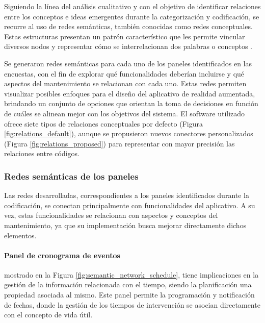         Siguiendo la línea del análisis cualitativo y con el objetivo de identificar relaciones entre los conceptos e ideas emergentes durante la categorización y codificación, se recurre al uso de redes semánticas, también conocidas como redes conceptuales. Estas estructuras presentan un patrón característico que les permite vincular diversos nodos y representar cómo se interrelacionan dos palabras o conceptos \parencite{PEREZ:2022}.  %

        Se generaron redes semánticas para cada uno de los paneles identificados en las encuestas, con el fin de explorar qué funcionalidades deberían incluirse y qué aspectos del mantenimiento se relacionan con cada uno. Estas redes permiten visualizar posibles enfoques para el diseño del aplicativo de realidad aumentada, brindando un conjunto de opciones que orientan la toma de decisiones en función de cuáles se alinean mejor con los objetivos del sistema. El software utilizado ofrece siete tipos de relaciones conceptuales por defecto (Figura \ref{fig:relations_default}), aunque se propusieron nuevos conectores personalizados (Figura \ref{fig:relations_proposed}) para representar con mayor precisión las relaciones entre códigos.

        

        

        \subsubsection{Redes semánticas de los paneles}

            Las redes desarrolladas, correspondientes a los paneles identificados durante la codificación, se conectan principalmente con funcionalidades del aplicativo. A su vez, estas funcionalidades se relacionan con aspectos y conceptos del mantenimiento, ya que su implementación busca mejorar directamente dichos elementos.
            
            \paragraph{Panel de cronograma de eventos} mostrado en la Figura \ref{fig:semantic_network_schedule}, tiene implicaciones en la gestión de la información relacionada con el tiempo, siendo la planificación una propiedad asociada al mismo. Este panel permite la programación y notificación de fechas, donde la gestión de los tiempos de intervención se asocian directamente con el concepto de vida útil.

